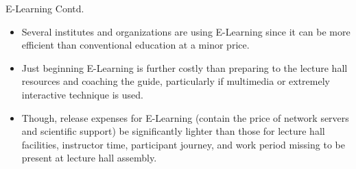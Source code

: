 \documentclass{beamer}
\begin{document}
\begin{frame}
\begin{block}{E-Learning Contd.}
\begin{itemize}

    \item Several institutes and organizations are using E-Learning since it can be more efficient than conventional education at a minor price.
    \item Just beginning E-Learning is further costly than preparing to the lecture hall resources and coaching the guide, particularly if multimedia or extremely interactive technique is used.
    \item Though, release expenses for E-Learning (contain the price of network servers and scientific support) be significantly lighter than those for lecture hall facilities, instructor time, participant journey, and work period missing to be present at lecture hall assembly. 
\end{itemize}
\end{block}
\end{frame}
\end{document}
